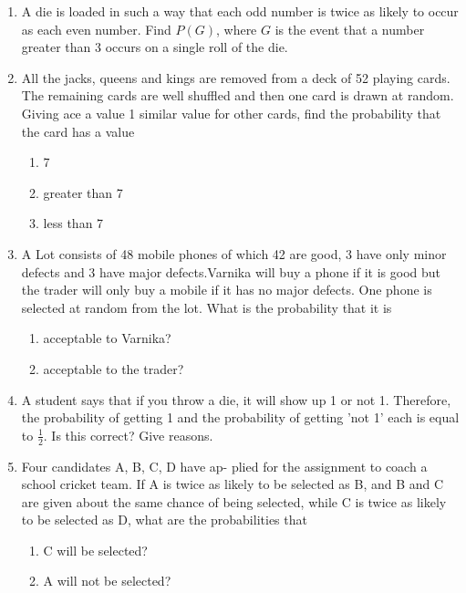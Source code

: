 \begin{enumerate}[label=\thesection.\arabic*,ref=\thesection.\theenumi]
	\item  A die is loaded in such a way that each odd number is twice as likely to occur as
each even number. Find $P(G)$, where $G$ is the event that a number greater than
3 occurs on a single roll of the die.
\\
\solution
		
	\item All the jacks, queens and kings are removed from a deck of 52 playing cards. The remaining cards are well shuffled and then one card is drawn at random. Giving ace a value 1 similar value for other cards, find the probability that the card has a value 
		\begin{enumerate}
			\item 7
			\item greater than 7
			\item less than 7
		\end{enumerate}
		
  \item A Lot consists of 48 mobile phones of which 42 are good, 3 have only minor defects and 3 have major defects.Varnika will buy a phone if it is good but the trader will only buy a mobile if it has no major defects. One phone is selected at random from the lot. What is the probability that it is
\begin{enumerate}
	\item acceptable to Varnika?
            \item acceptable to the trader?
\end{enumerate}
\solution
	
 \item A student says that if you throw a die, it will show up 1 or not 1. Therefore, the probability of getting 1 and the probability of getting 'not 1' each is equal to $\frac{1}{2}$. Is this correct? Give reasons.\\
 \solution
        
   \item Four candidates A, B, C, D have ap-
plied for the assignment to coach a school cricket
team. If A is twice as likely to be selected as B, and
B and C are given about the same chance of being
selected, while C is twice as likely to be selected
as D, what are the probabilities that
\begin{enumerate}
\item C will be selected?
\item A will not be selected?

\end{enumerate}
\end{enumerate}

